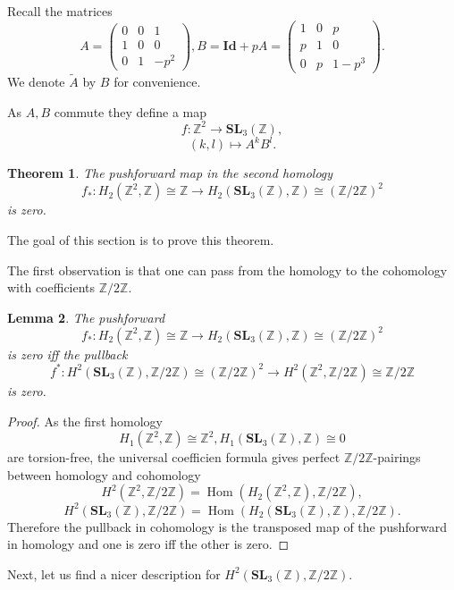 \documentclass[a4paper]{article}
\newtheorem{Thm}{Theorem}[section]
\newtheorem{Lem}[Thm]{Lemma}
\newcommand{\Id}{\mathbf{Id}}        %
\newcommand{\SL}{\mathbf{SL}_3(\mathbb{Z})}        %
\DeclareMathOperator{\Hom}{Hom}        %
\begin{document}
Recall the matrices 
\[
A = 
\begin{pmatrix}
0 & 0 & 1 \\
1 & 0 & 0 \\
0 & 1 & -p^2
\end{pmatrix}
,
B = \Id + p A =
\begin{pmatrix}
1 & 0 & p \\
p & 1 & 0 \\
0 & p & 1 - p^3
\end{pmatrix}
.\] 
We denote $\tilde A$ by $B$ for convenience.

As $A, B $ commute they define a map
\[
f: \mathbb{Z}^2 \to \SL, 
\] 
\[
(k, l) \mapsto A^k B^l
.\] 

\begin{Thm}
	\label{thm_push_homology_vanishes}
The pushforward map in the second homology 
\[
f_*:
H_2(\mathbb{Z}^2, \mathbb{Z}) \cong \mathbb{Z} \to 
H_2(\SL, \mathbb{Z}) \cong (\mathbb{Z}/2\mathbb{Z})^{2} 
\] 
is zero.
\end{Thm}
The goal of this section is to prove this theorem.

The first observation is that one can pass from the homology to the cohomology with coefficients $\mathbb{Z}/ 2 \mathbb{Z}$.

\begin{Lem}
	\label{lemma_push_vanishes_iff_pull_vanishes}
The pushforward
\[
f_*:
H_2(\mathbb{Z}^2, \mathbb{Z}) \cong \mathbb{Z} \to 
H_2(\SL, \mathbb{Z}) \cong (\mathbb{Z}/2\mathbb{Z})^{2} 
\] 
is zero 
iff
the pullback
\[
f^*:
H^2(\SL,  \mathbb{Z}/2 \mathbb{Z}) \cong (\mathbb{Z}/2\mathbb{Z})^{2} \to
H^2(\mathbb{Z}^2, \mathbb{Z}/2 \mathbb{Z}) \cong \mathbb{Z}/2 \mathbb{Z}
\] 
is zero.
\end{Lem}
\begin{proof}
As the first homology 
\[
H_1(\mathbb{Z}^2, \mathbb{Z}) \cong \mathbb{Z}^2, 
H_1(\SL, \mathbb{Z}) \cong 0
\] 
are torsion-free, the universal coefficien formula gives perfect $\mathbb{Z}/2\mathbb{Z}$-pairings between homology and cohomology
\[
H^2(\mathbb{Z}^2, \mathbb{Z}/2 \mathbb{Z}) = \Hom(H_2(\mathbb{Z}^2, \mathbb{Z}), \mathbb{Z}/2 \mathbb{Z})
,\] 
\[
H^2(\SL, \mathbb{Z}/2 \mathbb{Z}) = \Hom(H_2(\SL, \mathbb{Z}), \mathbb{Z}/2 \mathbb{Z})
.\] 
Therefore the pullback in cohomology is the transposed map of the pushforward in homology and one is zero iff the other is zero.
\end{proof}

Next, let us find a nicer description for $H^2(\SL, \mathbb{Z}/2 \mathbb{Z})$.
\end{document}
